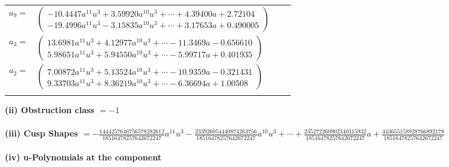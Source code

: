 \documentclass[1p]{elsarticle_modified}
\theoremstyle{definition}
\begin{document}
\begin{tabular}{m{7pt} m{180pt} m{7pt} m{180pt} }
\flushright $a_{9}=$&$\begin{pmatrix}-10.4447 a^{11} u^{3}+3.59920 a^{10} u^{3}+\cdots+4.39400 a+2.72104\\-19.4996 a^{11} u^{3}-3.15835 a^{10} u^{3}+\cdots+3.17653 a+0.490005\end{pmatrix}$ \\
\flushright $a_{3}=$&$\begin{pmatrix}13.6981 a^{11} u^{3}+4.12977 a^{10} u^{3}+\cdots-11.3469 a-0.656610\\5.98651 a^{11} u^{3}+5.94550 a^{10} u^{3}+\cdots-5.99717 a+0.401935\end{pmatrix}$ \\
\flushright $a_{2}=$&$\begin{pmatrix}7.00872 a^{11} u^{3}+5.13524 a^{10} u^{3}+\cdots-10.9359 a-0.321431\\9.33703 a^{11} u^{3}+8.36219 a^{10} u^{3}+\cdots-6.36694 a+1.00508\end{pmatrix}$\\&\end{tabular}
\flushleft \textbf{(ii) Obstruction class $= -1$}\\~\\
\flushleft \textbf{(iii) Cusp Shapes $= -\frac{1444257646756578282612}{18516478257642672247} a^{11} u^3-\frac{233926054440874263756}{18516478257642672247} a^{10} u^3+\cdots+\frac{235272260902340315932}{18516478257642672247} a+\frac{443655158928766892178}{18516478257642672247}$}\\~\\
\newpage\renewcommand{\arraystretch}{1}
\flushleft \textbf{(iv) u-Polynomials at the component}\newline \\
\end{document}
